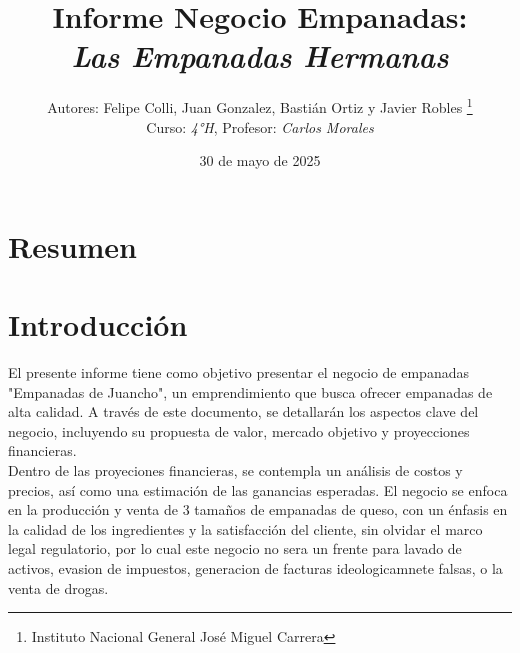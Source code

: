 \documentclass[12pt]{article}
\title{Informe Negocio Empanadas: \\
\textit{Las Empanadas Hermanas}} %
\author{Autores: Felipe Colli, Juan Gonzalez, Bastián Ortiz y Javier Robles \thanks{Instituto Nacional General José Miguel Carrera} \\
  Curso: \textit{4°H}, Profesor: \textit{Carlos Morales}} %
\date{30 de mayo de 2025} %
\begin{document}
\maketitle
\newpage

\tableofcontents
\newpage

\section{Resumen} %
\newpage



\section{Introducción} %
El presente informe tiene como objetivo presentar el negocio de empanadas "Empanadas de Juancho", un emprendimiento que busca ofrecer empanadas de alta calidad. A través de este documento, se detallarán los aspectos clave del negocio, incluyendo su propuesta de valor, mercado objetivo y proyecciones financieras. \\


Dentro de las proyeciones financieras, se contempla un análisis de costos y precios, así como una estimación de las ganancias esperadas. El negocio se enfoca en la producción y venta de 3 tamaños de empanadas de queso, con un énfasis en la calidad de los ingredientes y la satisfacción del cliente, sin olvidar el marco legal regulatorio, por lo cual este negocio no sera un frente para lavado de activos, evasion de impuestos, generacion de facturas ideologicamnete falsas, o la venta de drogas. \\ %
\end{document}
